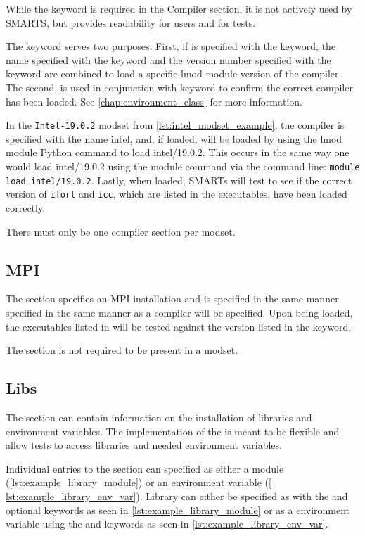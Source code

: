 While the \name keyword is required in the Compiler section, it is not actively 
used by SMARTS, but provides readability for users and for tests.

The \version keyword serves two purposes. First, if \version is specified with
the \module keyword, the name specified with the \module keyword and the
version number specified with the \version keyword are combined to load a
specific lmod module version of the compiler. The second, \version is used in
conjunction with \executables keyword to confirm the correct compiler has been
loaded. See \ref{chap:environment_class} for more information.

In the {\tt Intel-19.0.2} modset from \ref{lst:intel_modset_example}, the
compiler is specified with the name intel, and, if loaded, will be loaded by
using the lmod module Python command to load intel/19.0.2. This occurs in the
same way one would load intel/19.0.2 using the module command via the command
line: {\tt module load intel/19.0.2}. Lastly, when loaded, SMARTs will test to
see if the correct version of {\tt ifort} and {\tt icc}, which are listed in
the executables, have been loaded correctly.

There must only be one compiler section per modset.

\subsection{MPI}
\label{subsec:modset_mpi}

The \mpi section specifies an MPI installation and is specified in the same
manner specified in the same manner as a compiler will be specified. Upon being
loaded, the executables listed in \executables will be tested against the
version listed in the \version keyword.

The \mpi section is not required to be present in a modset.

\subsection{Libs}
\label{subsec:modset_libs}

The \libs section can contain information on the installation of libraries and
environment variables. The implementation of the \libs is meant to be flexible
and allow tests to access libraries and needed environment variables.

Individual entries to the \libs section can specified as either a module
(\ref{lst:example_library_module}) or an environment variable (\ref{
lst:example_library_env_var}). Library can either be specified as with the
\module and optional \version keywords as seen in
\ref{lst:example_library_module} or as a environment variable using the
\name and  keywords as seen in \ref{lst:example_library_env_var}.

